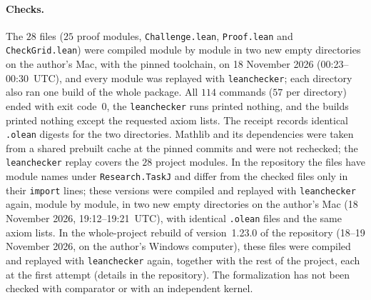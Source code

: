 \documentclass[11pt]{article}
\theoremstyle{remark}
\begin{document}
\paragraph{Checks.}
The $28$ files ($25$ proof modules, \texttt{Challenge.lean},
\texttt{Proof.lean} and \texttt{CheckGrid.lean}) were compiled module by module
in two new empty directories on the author's Mac, with the pinned toolchain,
on 18 November 2026 (00:23--00:30~UTC), and every module was replayed with
\texttt{leanchecker}; each directory also ran one build of the whole package.
All $114$ commands ($57$ per directory) ended with exit code~$0$, the
\texttt{leanchecker} runs printed nothing, and the builds printed nothing except
the requested axiom lists. The receipt records identical \texttt{.olean}
digests for the two directories. Mathlib and its dependencies were taken from
a shared prebuilt cache at the pinned commits and were not rechecked; the
\texttt{leanchecker} replay covers the $28$ project modules. In the repository the files have module names under \texttt{Research.TaskJ} and differ from the checked files only in their \texttt{import} lines; these versions were compiled and replayed with \texttt{leanchecker} again, module by module, in two new empty directories on the author's Mac (18 November 2026, 19:12--19:21~UTC), with identical \texttt{.olean} files and the same axiom lists. In the whole-project rebuild of version~1.23.0 of the repository (18--19 November 2026, on the author's Windows computer), these files were compiled and replayed with \texttt{leanchecker} again, together with the rest of the project, each at the first attempt (details in the repository). The
formalization has not been checked with comparator or with an independent
kernel.
\end{document}
